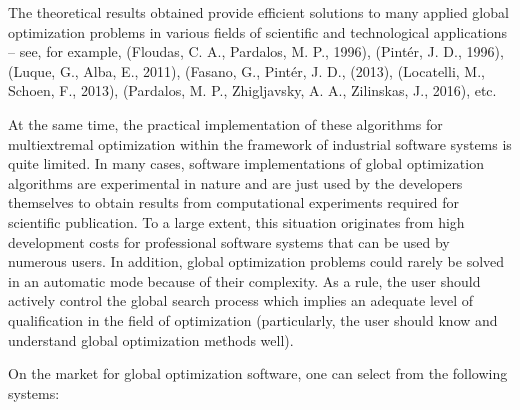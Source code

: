 \documentclass{gOMS2e}
\theoremstyle{plain}%
\theoremstyle{definition}
\theoremstyle{remark}
\begin{document}
\par
The theoretical results obtained provide efficient solutions to many applied global
optimization problems in various fields of scientific and technological applications – see,
for example, (Floudas, C. A., Pardalos, M. P., 1996), (Pintér, J. D., 1996), (Luque, G., Alba, E., 2011), (Fasano, G., Pintér, J. D., (2013), (Locatelli, M., Schoen, F., 2013), (Pardalos, M. P., Zhigljavsky, A. A., Zilinskas, J., 2016), etc.
\par
At the same time, the practical implementation of these algorithms for multiextremal
optimization within the framework of industrial software systems is quite limited.
In many cases, software implementations of global optimization algorithms are experimental in
nature and are just used by the developers themselves to obtain results from computational
experiments required for scientific publication. To a large extent, this situation
originates from high development costs for professional software systems that can be
used by numerous users. In addition, global optimization problems could rarely be
solved in an automatic mode because of their complexity. As a rule, the user should
actively control the global search process which implies an adequate level of
qualification in the field of optimization (particularly, the user should know and
understand global optimization methods well).
\par
On the market for global optimization software, one can select from the following systems:
\end{document}
